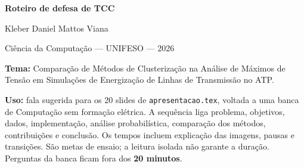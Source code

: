 \documentclass[11pt,a4paper]{article}
\begin{document}
\begin{center}
  {\LARGE\bfseries Roteiro de defesa de TCC\par}
  \vspace{3mm}
  {\large Kleber Daniel Mattos Viana\par}
  Ciência da Computação --- UNIFESO --- 2026
\end{center}

\textbf{Tema:} Comparação de Métodos de Clusterização na Análise de Máximos
de Tensão em Simulações de Energização de Linhas de Transmissão no ATP.

\textbf{Uso:} fala sugerida para os 20 slides de
\texttt{apresentacao.tex}, voltada a uma banca de Computação sem formação
elétrica. A sequência liga problema, objetivos, dados, implementação, análise probabilística, comparação dos métodos, contribuições e conclusão.
Os tempos incluem explicação das imagens, pausas e transições. São metas
de ensaio; a leitura isolada não garante a duração. Perguntas da banca
ficam fora dos \textbf{20 minutos}.
\end{document}
